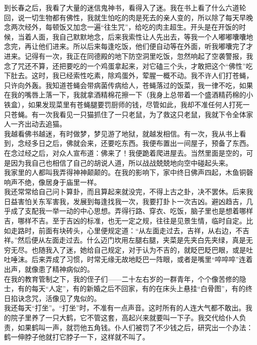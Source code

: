 到长春之后，我看了大量的迷信鬼神书，看得入了迷。我在书上看了什么六道轮回，说一切生物都有佛性，我就生怕吃的肉是死去的亲人变的，所以除了每天早晚念两次经外，每顿饭又加念一遍“往生咒”，给吃的肉主超生。开头是在开饭的时候，当着人面，我自己默默地念，后来我索性让人先出去，等我一个人嘟嘟囔囔地念完，再让他们进来。所以后来每逢吃饭，他们便自动等在外面，听我嘟囔完了才进来。记得有一次，我正在同德殿的地下防空洞里吃饭，忽然响起了空袭警报，我念了咒还不算，还把要吃的一个鸡蛋拿起来，对它磕三个头，才敢把这个“佛性”吃下肚去。这时，我已经索性吃素，除鸡蛋外，荤腥一概不动。我不许人们打苍蝇，只许向外轰。我知道苍蝇会带病菌传病给人，苍蝇落过的饭菜，我一律不吃，如果在我的嘴唇上落一下，我就拿酒精棉花擦一下（我身上总带着一个盛酒精药棉的小铁盒），如果发现菜里有苍蝇腿要罚厨师的钱，尽管如此，我却不准任何人打死一只苍蝇。有一次我看见一只猫抓住了一只老鼠，为了救这只老鼠，我就下令全体家人一齐出动去追猫。\\

我越看佛书越迷，有时做梦，梦见游了地狱，就越发相信。有一次，我从书上看到，念经多日之后，佛就会来，还要吃东西。我便布置出一间屋子，预备了东西。在念过经之后，对众人宣布道：佛来了！我便跪着爬进屋去。当然里面是空的，可是因为我自己也相信了自己的胡说人道，所以战战兢兢地向空中碰起头来。\\

我家里的人都叫我弄得神神颠颠的。在我的影响下，家中终日佛声四起，木鱼铜磬响声不绝，像居身于庙里一样。\\

我还常常给自己问卜算卦，而且算起来就没完，不得上古之卦，决不罢休。后来我日益害怕关东军害我，发展到每逢找我一次，我要打卦卜一次吉凶。避凶趋吉，几乎成了支配我一举一动的中心思想。弄得行路、穿衣、吃饭，脑子里也是想着哪样吉，哪样不吉。至于吉凶的标准，也无一定之规，往往是见景生情，临时自定。比如走路时，前面有块砖头，心里便规定道：“从左面走过去，吉祥，从右边，不吉祥。”然后便从左面走过去。什么迈门坎用左腿右腿，夹菜是先夹白先夹绿，真是无穷无尽。也随我入了迷，她给自己规定，对于认为不吉的，就眨巴眨巴眼，或是吐吐唾沫。后来弄成了习惯，时常无缘无故地眨巴一阵眼，或者是嘴里“啐啐啐”连着出声，就像患了精神病似的。\\

在我的教育管制之下，我的侄子们——二十左右岁的一群青年，个个像苦修的隐士，有的每天“人定”，有的新婚之后不回家，有的在床头上悬挂“白骨图”，有的终日掐诀念咒，活像见了鬼似的。\\

我还每天“打坐”。“打坐”时，不准有一点声音。这时所有的人连大气都不敢出。我的院子里养了一只大鹤，它不管这套，高起兴来就要叫一下子。我交代给仆人负责，如果鹤叫一声，就罚他五角钱。仆人们被罚了不少钱之后，研究出一个办法：鹤一伸脖子他就打它脖子一下，这样就不叫了。\\

